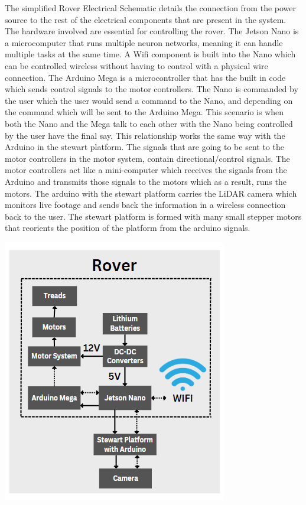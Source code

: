 \documentclass[a4paper, 10pt]{article}
\begin{document}
		The simplified Rover Electrical Schematic details the connection from the power source to the rest of the electrical components that are present in the system. The hardware involved are essential for controlling the rover. The Jetson Nano is a microcomputer that runs multiple neuron networks, meaning it can handle multiple tasks at the same time. A Wifi component is built into the Nano which can be controlled wireless without having to control with a physical wire connection. The Arduino Mega is a microcontroller that has the built in code which sends control signals to the motor controllers. The Nano is commanded by the user which the user would send a command to the Nano, and depending on the command which will be sent to the Arduino Mega. This scenario is when both the Nano and the Mega talk to each other with the Nano being controlled by the user have the final say. This relationship works the same way with the Arduino in the stewart platform. The signals that are going to be sent to the motor controllers in the motor system, contain directional/control signals. The motor controllers act like a mini-computer which receives the signals from the Arduino and transmits those signals to the motors which as a result, runs the motors. The arduino with the stewart platform carries the LiDAR camera which monitors live footage and sends back the information in a wireless connection back to the user. The stewart platform is formed with many small stepper motors that reorients the position of the platform from the arduino signals.  
		
		\includegraphics[scale=0.8]{Photos/Rover schematic simplified}
	
\end{document}
